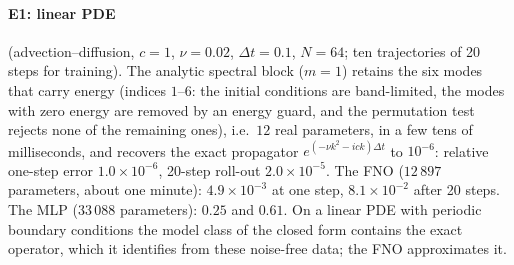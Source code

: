 \documentclass[11pt,a4paper]{article}
\theoremstyle{plain}
\theoremstyle{definition}
\theoremstyle{remark}
\begin{document}
\paragraph{E1: linear PDE} (advection--diffusion, $c=1$, $\nu=0.02$,
$\Delta t=0.1$, $N=64$; ten trajectories of 20 steps for training). The
analytic spectral block ($m=1$) retains the six modes that carry energy
(indices $1$--$6$: the initial conditions are band-limited, the modes with
zero energy are removed by an energy guard, and the permutation test rejects
none of the remaining ones), i.e.\ $12$ real parameters, in a few tens of
milliseconds, and recovers the exact propagator
$e^{(-\nu k^2-ick)\Delta t}$ to $10^{-6}$: relative one-step error
$1.0\times10^{-6}$, 20-step roll-out $2.0\times10^{-5}$. The FNO ($12\,897$
parameters, about one minute): $4.9\times10^{-3}$ at one step,
$8.1\times10^{-2}$ after 20 steps. The MLP ($33\,088$ parameters): $0.25$ and
$0.61$. On a linear PDE with periodic boundary conditions the model class of
the closed form contains the exact operator, which it identifies from these
noise-free data; the FNO approximates it.
\end{document}
